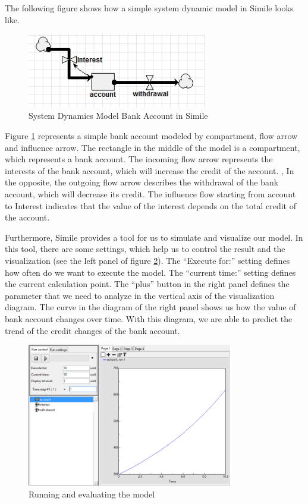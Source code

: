 \par
The following figure shows how a simple system dynamic model in Simile looks like.
\begin{figure}[h]
	\centering
	\includegraphics[width=0.7\textwidth]{pics/simile/simile_example_bank_account.png}
	\caption{System Dynamics Model Bank Account in Simile \label{fig:simile_example_bank}}	
\end{figure}
\par
Figure \ref{fig:simile_example_bank} represents a simple bank account modeled by compartment, flow arrow and influence arrow. The rectangle in the middle of the model is a compartment, which represents a bank account. The incoming flow arrow represents the interests of the bank account, which will increase the credit of the account. , In the opposite, the outgoing flow arrow describes the withdrawal of the bank account, which will decrease its credit. The influence flow starting from account to Interest indicates that the value of the interest depends on the total credit of the account.
\par
Furthermore, Simile provides a tool for us to simulate and visualize our model. In this tool, there are some settings, which help us to control the result and the visualization (see the left panel of figure \ref{fig:simile_example_evaluating}). The ``Execute for:'' setting defines how often do we want to execute the model. The ``current time:'' setting defines the current calculation point. The ``plus'' button in the right panel defines the parameter that we need to analyze in the vertical axis of the visualization diagram. The curve in the diagram of the right panel shows us how the value of bank account changes over time. With this diagram, we are able to predict the trend of the credit changes of the bank account.
\begin{figure}[h]
	\centering
	\includegraphics[width=0.8\textwidth]{pics/simile/simile_example_evaluating_model.png}
	\caption{Running and evaluating the model \label{fig:simile_example_evaluating}}	
\end{figure}
